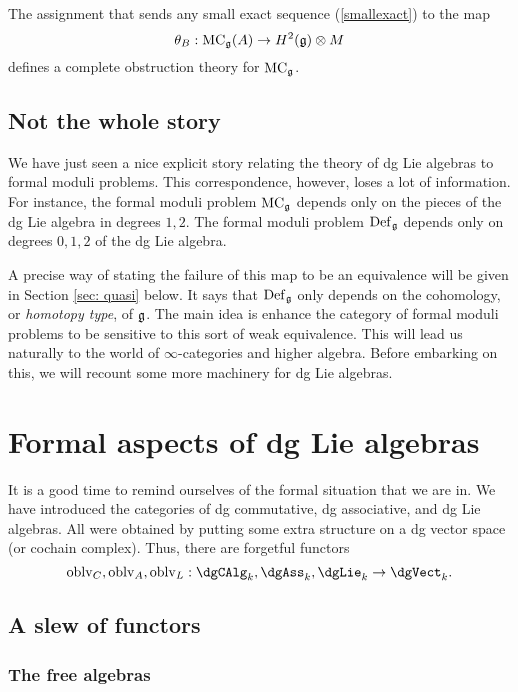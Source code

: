 \documentclass[11pt]{amsart}
\begin{document}
\begin{prop}
The assignment that sends any small exact sequence (\ref{smallexact}) to the map
\[
\theta_B : {\rm MC}_\mathfrak g(A) \to H^2(\mathfrak g) \otimes M
\]
defines a complete obstruction theory for ${\rm MC}_\mathfrak g$. 
\end{prop}

\subsection{Not the whole story}

We have just seen a nice explicit story relating the theory of dg Lie algebras to formal moduli problems. 
This correspondence, however, loses a lot of information.
For instance, the formal moduli problem ${\rm MC}_\mathfrak g$ depends only on the pieces of the dg Lie algebra in degrees $1, 2$.
The formal moduli problem ${\rm Def}_\mathfrak g$ depends only on degrees $0,1,2$ of the dg Lie algebra. 

A precise way of stating the failure of this map to be an equivalence will be given in Section \ref{sec: quasi} below.
It says that ${\rm Def}_\mathfrak g$ only depends on the cohomology, or {\em homotopy type}, of $\mathfrak g$.
The main idea is enhance the category of formal moduli problems to be sensitive to this sort of weak equivalence. 
This will lead us naturally to the world of $\infty$-categories and higher algebra. 
Before embarking on this, we will recount some more machinery for dg Lie algebras. 

\section{Formal aspects of dg Lie algebras}

\def\oblv{{\rm oblv}}

It is a good time to remind ourselves of the formal situation that we are in. 
We have introduced the categories of dg commutative, dg associative, and dg Lie algebras.
All were obtained by putting some extra structure on a dg vector space (or cochain complex).
Thus, there are forgetful functors
\[
\oblv_{C}, \oblv_{A}, \oblv_L : \dgCAlg_k, \dgAss_k, \dgLie_k \to \dgVect_k .
\] 

\subsection{A slew of functors}
\def\Tens{{\rm Tens}}

\subsubsection{The free algebras}
\end{document}
